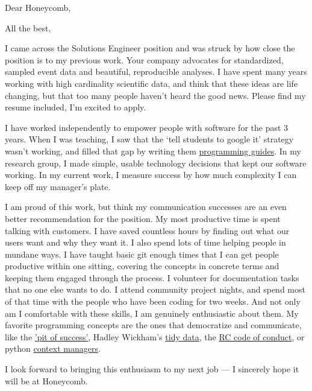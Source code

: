 \documentclass[11pt,a4paper,sans]{moderncv}        %
\begin{document}
\recipient{~}{~}
\date{\today}
\opening{Dear Honeycomb,}
\closing{All the best,}
\makelettertitle%

I came across the Solutions Engineer position and was struck by how close the position is to my previous work.
Your company advocates for standardized, sampled event data and beautiful, reproducible analyses.
I have spent many years working with high cardinality scientific data, and think that these ideas are life changing, but that too many people haven't heard the good news.
Please find my resume included, I'm excited to apply.

I have worked independently to empower people with software for the past 3 years.
When I was teaching, I saw that the `tell students to google it' strategy wasn't working, and filled that gap by writing them \textcolor{cyan}{\href{https://github.com/jgarst/AdvancedLab/releases/download/spring_2016/Python-FirstSteps.pdf}{programming guides}}.
In my research group, I made simple, usable technology decisions that kept our software working.
In my current work, I measure success by how much complexity I can keep off my manager's plate.

I am proud of this work, but think my communication successes are an even better recommendation for the position.
My most productive time is spent talking with customers.
I have saved countless hours by finding out what our users want and why they want it.
I also spend lots of time helping people in mundane ways. I have taught basic git enough times that I can get people productive within one sitting, covering the concepts in concrete terms and keeping them engaged through the process.
I volunteer for documentation tasks that no one else wants to do.
I attend community project nights, and spend most of that time with the people who have been coding for two weeks.
And not only am I comfortable with these skills, I am genuinely enthusiastic about them.
My favorite programming concepts are the ones that democratize and communicate, like the \textcolor{cyan}{\href{https://blog.codinghorror.com/falling-into-the-pit-of-success/}{'pit of success'}}, Hadley Wickham's \textcolor{cyan}{\href{https://cran.r-project.org/web/packages/tidyverse/vignettes/manifesto.html}{tidy data}}, the \textcolor{cyan}{\href{https://www.recurse.com/code-of-conduct}{RC code of conduct}}, or python \textcolor{cyan}{\href{http://arnavk.com/posts/python-context-managers/}{context managers}}.

I look forward to bringing this enthusiasm to my next job --- I sincerely hope it will be at Honeycomb.

\makeletterclosing%
\end{document}
